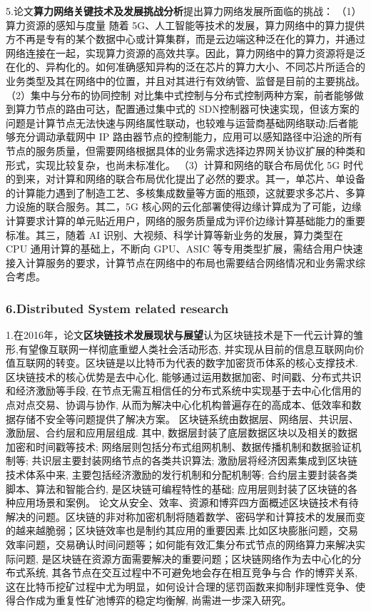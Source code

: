 \documentclass[a4paper,twoside]{scrbook}
\begin{document}
5.论文\textbf{算力网络关键技术及发展挑战分析}提出算力网络发展所面临的挑战：
（1）算力资源的感知与度量
随着 5G、人工智能等技术的发展，算力网络中的算力提供方不再是专有的某个数据中心或计算集群，而是云边端这种泛在化的算力，并通过网络连接在一起，实现算力资源的高效共享。因此，算力网络中的算力资源将是泛在化的、异构化的。如何准确感知异构的泛在芯片的算力大小、不同芯片所适合的业务类型及其在网络中的位置，并且对其进行有效纳管、监督是目前的主要挑战。
（2）集中与分布的协同控制
对比集中式控制与分布式控制两种方案，前者能够做到算力节点的路由可达，配置通过集中式的 SDN控制器可快速实现，但该方案的问题是计算节点无法快速与网络属性联动，也较难与运营商基础网络联动;后者能够充分调动承载网中 IP 路由器节点的控制能力，应用可以感知路径中沿途的所有节点的服务质量，但需要网络根据具体的业务需求选择边界网关协议扩展的种类和形式，实现比较复杂，也尚未标准化。
（3）计算和网络的联合布局优化
5G 时代的到来，对计算和网络的联合布局优化提出了必然的要求。其一，单芯片、单设备的计算能力遇到了制造工艺、多核集成数量等方面的瓶颈，这就要求多芯片、多算力设施的联合服务。其二，5G 核心网的云化部署使得边缘计算成为了可能，边缘计算要求计算的单元贴近用户，网络的服务质量成为评价边缘计算基础能力的重要标准。其三，随着 AI 识别、大视频、科学计算等新业务的发展，算力类型在 CPU 通用计算的基础上，不断向 GPU、ASIC 等专用类型扩展，需结合用户快速接入计算服务的要求，计算节点在网络中的布局也需要结合网络情况和业务需求综合考虑。


\subsubsection{6.Distributed System related research}
1.在2016年，论文\textbf{区块链技术发展现状与展望}认为区块链技术是下一代云计算的雏形,有望像互联网一样彻底重塑人类社会活动形态, 并实现从目前的信息互联网向价值互联网的转变。区块链是以比特币为代表的数字加密货币体系的核心支撑技术. 区块链技术的核心优势是去中心化, 能够通过运用数据加密、时间戳、分布式共识和经济激励等手段, 在节点无需互相信任的分布式系统中实现基于去中心化信用的点对点交易、协调与协作, 从而为解决中心化机构普遍存在的高成本、低效率和数据存储不安全等问题提供了解决方案。
区块链系统由数据层、网络层、共识层、激励层、合约层和应用层组成. 其中, 数据层封装了底层数据区块以及相关的数据加密和时间戳等技术; 网络层则包括分布式组网机制、数据传播机制和数据验证机制等; 共识层主要封装网络节点的各类共识算法; 激励层将经济因素集成到区块链技术体系中来, 主要包括经济激励的发行机制和分配机制等; 合约层主要封装各类脚本、算法和智能合约, 是区块链可编程特性的基础; 应用层则封装了区块链的各种应用场景和案例。
论文从安全、效率、资源和博弈四方面概述区块链技术有待解决的问题。区块链的非对称加密机制将随着数学、密码学和计算技术的发展而变的越来越脆弱；区块链效率也是制约其应用的重要因素.比如区块膨胀问题，交易效率问题，交易确认时间问题等；如何能有效汇集分布式节点的网络算力来解决实际问题, 是区块链在资源方面需要解决的重要问题；区块链网络作为去中心化的分布式系统, 其各节点在交互过程中不可避免地会存在相互竞争与合
作的博弈关系, 这在比特币挖矿过程中尤为明显，如何设计合理的惩罚函数来抑制非理性竞争、使得合作成为重复性矿池博弈的稳定均衡解, 尚需进一步深入研究。
\end{document}
